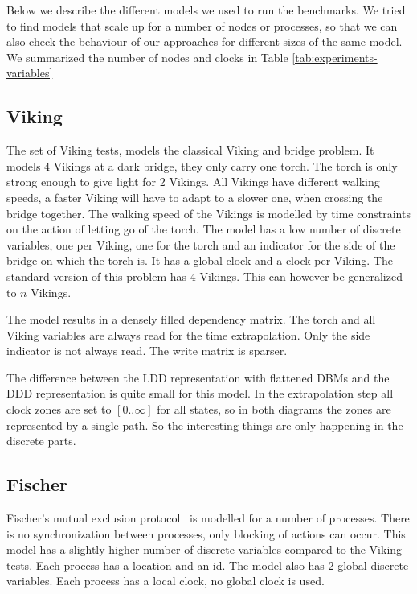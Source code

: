 Below we describe the different models we used to run the benchmarks. We tried to find models that scale up for a number of nodes or processes, so that we can also check the behaviour of our approaches for different sizes of the same model. We summarized the number of nodes and clocks in Table \ref{tab:experiments-variables}

\subsection{Viking}
The set of Viking tests, models the classical Viking and bridge problem. It models 4 Vikings at a dark bridge, they only carry one torch. The torch is only strong enough to give light for 2 Vikings. All Vikings have different walking speeds, a faster Viking will have to adapt to a slower one, when crossing the bridge together. The walking speed of the Vikings is modelled by time constraints on the action of letting go of the torch. The model has a low number of discrete variables, one per Viking, one for the torch and an indicator for the side of the bridge on which the torch is. It has a global clock and a clock per Viking. The standard version of this problem has 4 Vikings. This can however be generalized to $n$ Vikings.

The model results in a densely filled dependency matrix. The torch and all Viking variables are always read for the time extrapolation. Only the side indicator is not always read. The write matrix is sparser. 

The difference between the LDD representation with flattened DBMs and the DDD representation is quite small for this model. In the extrapolation step all clock zones are set to $[0..\infty]$ for all states, so in both diagrams the zones are represented by a single path. So the interesting things are only happening in the discrete parts.

\subsection{Fischer}
Fischer's mutual exclusion protocol~\cite{Lamport:1987:FME:7351.7352} is modelled for a number of processes. There is no synchronization between processes, only blocking of actions can occur. This model has a slightly higher number of discrete variables compared to the Viking tests. Each process has a location and an id. The model also has 2 global discrete variables. Each process has a local clock, no global clock is used.

